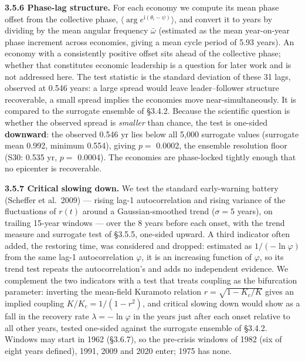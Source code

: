 \documentclass[11pt,a4paper]{article}
\newcounter{none}                    %
\begin{document}
\textbf{3.5.6 Phase-lag structure.} For each economy we compute its mean phase offset from the collective phase, \(\langle \arg e^{\mathrm{i}(\theta_i - \psi)}\rangle\), and convert it to years by dividing by the mean angular frequency \(\bar\omega\) (estimated as the mean year-on-year phase increment across economies, giving a mean cycle period of 5.93 years). An economy with a consistently positive offset sits ahead of the collective phase; whether that constitutes economic leadership is a question for later work and is not addressed here. The test statistic is the standard deviation of these 31 lags, observed at 0.546 years: a large spread would leave leader–follower structure recoverable, a small spread implies the economies move near-simultaneously. It is compared to the surrogate ensemble of §3.4.2. Because the scientific question is whether the observed spread is \emph{smaller} than chance, the test is one-sided \textbf{downward}: the observed 0.546 yr lies below all 5,000 surrogate values (surrogate mean 0.992, minimum 0.554), giving \(p =\) 0.0002, the ensemble resolution floor (S30: 0.535 yr, \(p =\) 0.0004). The economies are phase-locked tightly enough that no epicenter is recoverable.

\textbf{3.5.7 Critical slowing down.} We test the standard early-warning battery (Scheffer et al.~2009) — rising lag-1 autocorrelation and rising variance of the fluctuations of \(r(t)\) around a Gaussian-smoothed trend (\(\sigma = 5\) years), on trailing 15-year windows — over the 8 years before each onset, with the trend measure and surrogate test of §3.5.5, one-sided upward. A third indicator often added, the restoring time, was considered and dropped: estimated as \(1/(-\ln\varphi)\) from the same lag-1 autocorrelation \(\varphi\), it is an increasing function of \(\varphi\), so its trend test repeats the autocorrelation's and adds no independent evidence. We complement the two indicators with a test that treats coupling as the bifurcation parameter: inverting the mean-field Kuramoto relation \(r = \sqrt{1 - K_c/K}\) gives an implied coupling \(K/K_c = 1/(1 - r^2)\), and critical slowing down would show as a fall in the recovery rate \(\lambda = -\ln\varphi\) in the years just after each onset relative to all other years, tested one-sided against the surrogate ensemble of §3.4.2. Windows may start in 1962 (§3.6.7), so the pre-crisis windows of 1982 (six of eight years defined), 1991, 2009 and 2020 enter; 1975 has none.
\end{document}
